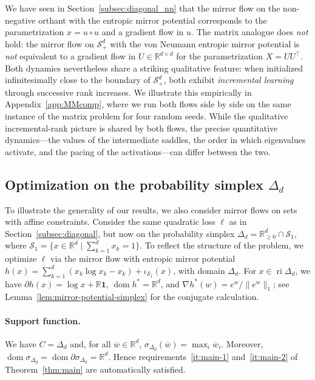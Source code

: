 \documentclass[11pt,english,reqno]{article}
\DeclareMathOperator{\dom}{dom}
\DeclareMathOperator{\ri}{ri}
\newcommand{\R}{\mathbb{R}}
\renewcommand{\geq}{\geqslant}
\theoremstyle{plain}
\theoremstyle{definition}
\theoremstyle{remark}
\numberwithin{equation}{section}
\begin{document}
We have seen in Section~\ref{subsec:diagonal_nn} that the mirror flow on the non-negative orthant with the entropic mirror potential corresponds to the parametrization $x = u \circ u$ and a gradient flow in $u$. The matrix analogue does \emph{not} hold: the mirror flow on $\mathcal{S}^d_+$ with the von Neumann entropic mirror potential is \emph{not} equivalent to a gradient flow in $U \in \R^{d \times d}$ for the parametrization $X = U U^\top$. Both dynamics nevertheless share a striking qualitative feature: when initialized infinitesimally close to the boundary of $\mathcal{S}^d_+$, both exhibit \emph{incremental learning} through successive rank increases. We illustrate this empirically in Appendix~\ref{app:MMcomp}, where we run both flows side by side on the same instance of the matrix problem for four random seeds. While the qualitative incremental-rank picture is shared by both flows, the precise quantitative dynamics---the values of the intermediate saddles, the order in which eigenvalues activate, and the pacing of the activations---can differ between the two.

\subsection{Optimization on the probability simplex \texorpdfstring{$\Delta_d$}{}}
\label{subsec:simplex}

To illustrate the generality of our results, we also consider mirror flows on sets with affine constraints. Consider the same quadratic loss $\ell$ as in Section~\ref{subsec:diagonal}, but now on the probability simplex $\Delta_d = \R^d_{\geq 0} \cap \mathcal{S}_1$, where $\mathcal{S}_1 = \{x \in \R^d \mid \sum_{k=1}^d x_k = 1\}$. To reflect the structure of the problem, we optimize $\ell$ via the mirror flow with entropic mirror potential $h(x) = \sum_{k=1}^d (x_k \log x_k - x_k) + \iota_{\mathcal{S}_1}(x)$, with domain $\Delta_d$. For $x \in \ri \Delta_d$, we have $\partial h (x) = \log x + \R \mathbf{1}$, $\dom h^* = \R^d$, and $\nabla h^*(w) = e^w /\|e^w\|_1$; see Lemma~\ref{lem:mirror-potential-simplex} for the conjugate calculation.

\paragraph{Support function.} We have $C = \Delta_d$ and, for all $\overline{w} \in \R^d$, $\sigma_{\Delta_d}(\overline{w}) = \max_i \overline{w}_i$. Moreover, $\dom \sigma_{\Delta_d} = \dom \partial \sigma_{\Delta_d} = \R^d$. Hence requirements~\ref{it:main-1} and~\ref{it:main-2} of Theorem~\ref{thm:main} are automatically satisfied.
%
\end{document}
